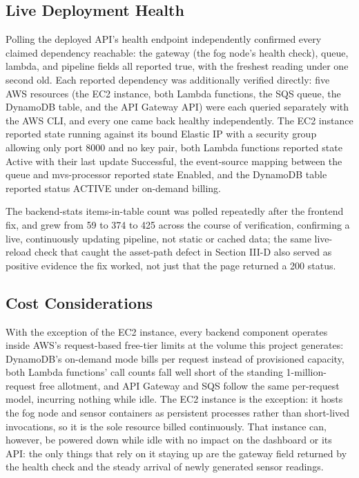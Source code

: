 \documentclass[conference]{IEEEtran}
\begin{document}
\subsection{Live Deployment Health}
Polling the deployed API's health endpoint independently confirmed every claimed dependency reachable: the gateway (the fog node's health check), queue, lambda, and pipeline fields all reported true, with the freshest reading under one second old. Each reported dependency was additionally verified directly: five AWS resources (the EC2 instance, both Lambda functions, the SQS queue, the DynamoDB table, and the API Gateway API) were each queried separately with the AWS CLI, and every one came back healthy independently. The EC2 instance reported state running against its bound Elastic IP with a security group allowing only port 8000 and no key pair, both Lambda functions reported state Active with their last update Successful, the event-source mapping between the queue and mvs-processor reported state Enabled, and the DynamoDB table reported status ACTIVE under on-demand billing.

The backend-stats items-in-table count was polled repeatedly after the frontend fix, and grew from 59 to 374 to 425 across the course of verification, confirming a live, continuously updating pipeline, not static or cached data; the same live-reload check that caught the asset-path defect in Section III-D also served as positive evidence the fix worked, not just that the page returned a 200 status.

\subsection{Cost Considerations}
With the exception of the EC2 instance, every backend component operates inside AWS's request-based free-tier limits at the volume this project generates: DynamoDB's on-demand mode bills per request instead of provisioned capacity, both Lambda functions' call counts fall well short of the standing 1-million-request free allotment, and API Gateway and SQS follow the same per-request model, incurring nothing while idle. The EC2 instance is the exception: it hosts the fog node and sensor containers as persistent processes rather than short-lived invocations, so it is the sole resource billed continuously. That instance can, however, be powered down while idle with no impact on the dashboard or its API: the only things that rely on it staying up are the gateway field returned by the health check and the steady arrival of newly generated sensor readings.
\end{document}
